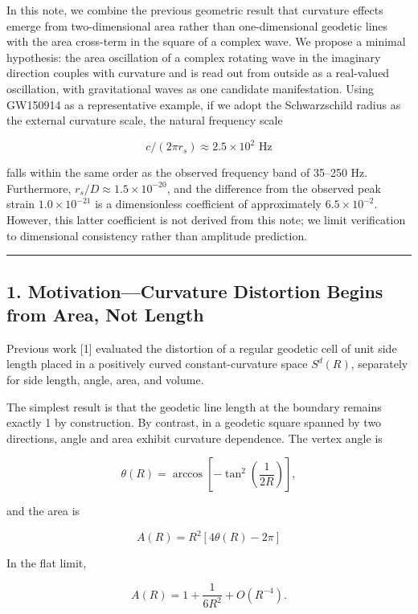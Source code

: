 \documentclass[
  a4paper,
]{article}
\begin{document}
In this note, we combine the previous geometric result that curvature
effects emerge from two-dimensional area rather than one-dimensional
geodetic lines with the area cross-term in the square of a complex wave.
We propose a minimal hypothesis: the area oscillation of a complex
rotating wave in the imaginary direction couples with curvature and is
read out from outside as a real-valued oscillation, with gravitational
waves as one candidate manifestation. Using GW150914 as a representative
example, if we adopt the Schwarzschild radius as the external curvature
scale, the natural frequency scale

\[c/(2\pi r_s) \approx 2.5 \times 10^2 \text{ Hz}\]

falls within the same order as the observed frequency band of 35--250
Hz. Furthermore, \(r_s/D \approx 1.5 \times 10^{-20}\), and the
difference from the observed peak strain \(1.0 \times 10^{-21}\) is a
dimensionless coefficient of approximately \(6.5 \times 10^{-2}\).
However, this latter coefficient is not derived from this note; we limit
verification to dimensional consistency rather than amplitude
prediction.

\begin{center}\rule{0.5\linewidth}{0.5pt}\end{center}

\subsection{1. Motivation---Curvature Distortion Begins from Area, Not
Length}\label{motivationcurvature-distortion-begins-from-area-not-length}

Previous work {[}1{]} evaluated the distortion of a regular geodetic
cell of unit side length placed in a positively curved
constant-curvature space \(S^d(R)\), separately for side length, angle,
area, and volume.

The simplest result is that the geodetic line length at the boundary
remains exactly 1 by construction. By contrast, in a geodetic square
spanned by two directions, angle and area exhibit curvature dependence.
The vertex angle is

\[\theta(R)=\arccos\left[-\tan^2\left(\frac{1}{2R}\right)\right],\]

and the area is

\[A(R) = R^2\left[4\theta(R)-2\pi\right]\]

In the flat limit,

\[A(R) = 1+\frac{1}{6R^2}+O(R^{-4}).\]
\end{document}
